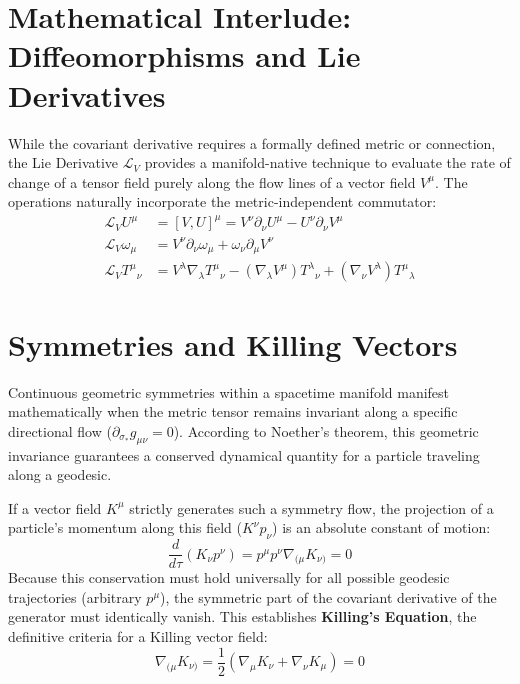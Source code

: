\documentclass[11pt, a4paper]{report}
\begin{document}
\section{Mathematical Interlude: Diffeomorphisms and Lie Derivatives}
While the covariant derivative requires a formally defined metric or connection, the Lie Derivative $\mathcal{L}_V$ provides a manifold-native technique to evaluate the rate of change of a tensor field purely along the flow lines of a vector field $V^\mu$. The operations naturally incorporate the metric-independent commutator:
\begin{align}
\mathcal{L}_V U^\mu &= [V, U]^\mu = V^\nu \partial_\nu U^\mu - U^\nu \partial_\nu V^\mu \\
\mathcal{L}_V \omega_\mu &= V^\nu \partial_\nu \omega_\mu + \omega_\nu \partial_\mu V^\nu \\
\mathcal{L}_V {T^\mu}_\nu &= V^\lambda \nabla_\lambda {T^\mu}_\nu - (\nabla_\lambda V^\mu) {T^\lambda}_\nu + (\nabla_\nu V^\lambda) {T^\mu}_\lambda
\end{align}

\section{Symmetries and Killing Vectors}
Continuous geometric symmetries within a spacetime manifold manifest mathematically when the metric tensor remains invariant along a specific directional flow ($\partial_{\sigma_*} g_{\mu\nu} = 0$). According to Noether's theorem, this geometric invariance guarantees a conserved dynamical quantity for a particle traveling along a geodesic.

If a vector field $K^\mu$ strictly generates such a symmetry flow, the projection of a particle's momentum along this field ($K^\nu p_\nu$) is an absolute constant of motion:
\begin{equation}
\frac{d}{d\tau} (K_\nu p^\nu) = p^\mu p^\nu \nabla_{(\mu} K_{\nu)} = 0
\end{equation}
Because this conservation must hold universally for all possible geodesic trajectories (arbitrary $p^\mu$), the symmetric part of the covariant derivative of the generator must identically vanish. This establishes \textbf{Killing's Equation}, the definitive criteria for a Killing vector field:
\begin{equation}\label{eq:killing_eq}
\nabla_{(\mu} K_{\nu)} = \frac{1}{2} (\nabla_\mu K_\nu + \nabla_\nu K_\mu) = 0
\end{equation}
\end{document}
